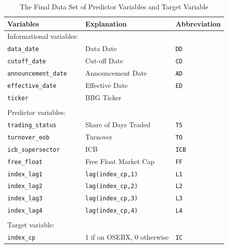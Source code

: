 \begin{table}[H]
\centering
\begin{tabularx}{0.8\textwidth}{lXl}
\toprule
Variables & Explanation & Abbreviation \\ 
\midrule
{Informational variables:} \\
\texttt{data\_date}         & Data Date  & \texttt{DD} \\
\texttt{cutoff\_date}       & Cut-off Date  & \texttt{CD} \\
\texttt{announcement\_date} & Announcement Date & \texttt{AD} \\
\texttt{effective\_date}    & Effective Date & \texttt{ED} \\
\texttt{ticker}             & BBG Ticker \\
 & \\
{Predictor variables:} \\
\texttt{trading\_status}    & Share of Days Traded   & \texttt{TS}\\
\texttt{turnover\_eob}      & Turnover & \texttt{TO}\\
\texttt{icb\_supersector}   & ICB  & \texttt{ICB}\\
\texttt{free\_float}        & Free Float Market Cap & \texttt{FF} \\
\texttt{index\_lag1}        & \texttt{lag(index\_cp,1)} & \texttt{L1} \\
\texttt{index\_lag2}        & \texttt{lag(index\_cp,2)} & \texttt{L2} \\
\texttt{index\_lag3}        & \texttt{lag(index\_cp,3)} & \texttt{L3} \\
\texttt{index\_lag4}        & \texttt{lag(index\_cp,4)} & \texttt{L4} \\
 & \\
{Target variable:} \\
\texttt{index\_cp} & {1 if on OSEBX, 0 otherwise} &  \texttt{IC} \\
\bottomrule
\end{tabularx}
\vspace{1em}
\caption{{The Final Data Set of Predictor Variables and Target Variable}}
\label{tab:final-data-set-predictor-target}
\end{table}

